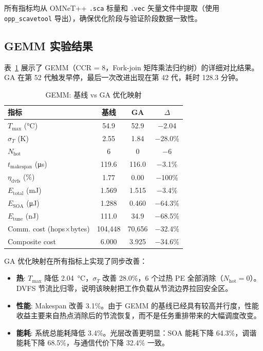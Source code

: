 \documentclass[conference]{IEEEtran}
\begin{document}
所有指标均从 OMNeT++ \texttt{.sca} 标量和 \texttt{.vec} 矢量文件中提取（使用 \texttt{opp\_scavetool} 导出），确保优化阶段与验证阶段数据一致性。

\subsection{GEMM 实验结果}

表~\ref{tab:gemm} 展示了 GEMM（CCR = 8，Fork-join 矩阵乘法归约树）的详细对比结果。GA 在第 52 代触发早停，最后一次改进出现在第 42 代，耗时 128.3 分钟。

\begin{table}[h]
\centering
\caption{GEMM: 基线 vs GA 优化映射}
\label{tab:gemm}
\begin{tabular}{lccc}
\toprule
\textbf{指标} & \textbf{基线} & \textbf{GA} & \textbf{$\Delta$} \\
\midrule
$T_{\max}$ (\si{\degreeCelsius}) & 54.9 & 52.9 & $-$2.04 \\
$\sigma_T$ (K) & 2.55 & 1.84 & $-$28.0\% \\
$N_{\text{hot}}$ & 6 & 0 & $-$6 \\
$t_{\text{makespan}}$ (\si{\micro\second}) & 119.6 & 116.0 & $-$3.1\% \\
$\eta_{\text{dvfs}}$ (\%) & 1.77 & 0.00 & $-$100\% \\
$E_{\text{total}}$ (\si{\milli\joule}) & 1.569 & 1.515 & $-$3.4\% \\
$E_{\text{SOA}}$ (\si{\micro\joule}) & 1.288 & 0.460 & $-$64.3\% \\
$E_{\text{tune}}$ (\si{\nano\joule}) & 111.0 & 34.9 & $-$68.5\% \\
Comm. cost (hops$\times$bytes) & 104,448 & 70,656 & $-$32.4\% \\
Composite cost & 6.000 & 3.925 & $-$34.6\% \\
\bottomrule
\end{tabular}
\end{table}

GA 优化映射在所有指标上实现了同步改善：

\begin{itemize}
\item \textbf{热}: $T_{\max}$ 降低 \SI{2.04}{\degreeCelsius}，$\sigma_T$ 改善 28.0\%，6 个过热 PE 全部消除（$N_{\text{hot}} = 0$）。DVFS 节流比归零，说明该映射把工作负载从节流边界拉回安全区。
\item \textbf{性能}: Makespan 改善 3.1\%。由于 GEMM 的基线已经具有较高并行度，性能收益主要来自热点消除后的节流恢复，而不是任务重排带来的大幅调度改变。
\item \textbf{能耗}: 系统总能耗降低 3.4\%。光层改善更明显：SOA 能耗下降 64.3\%，调谐能耗下降 68.5\%，与通信代价下降 32.4\% 一致。
\end{itemize}
\end{document}
